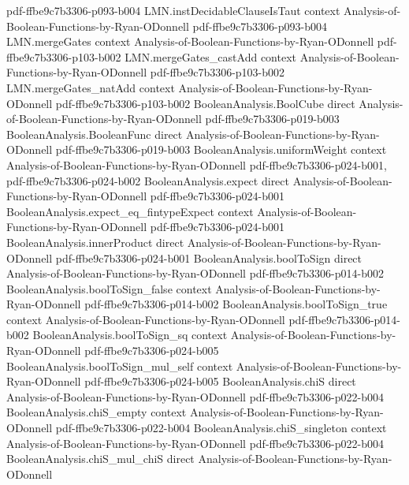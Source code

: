 \begin{theorem}
  {pdf-ffbe9c7b3306-p093-b004}
\proofstep
  {LMN.instDecidableClauseIsTaut}
  {context}
  {Analysis-of-Boolean-Functions-by-Ryan-ODonnell}
  {pdf-ffbe9c7b3306-p093-b004}
\proofstep
  {LMN.mergeGates}
  {context}
  {Analysis-of-Boolean-Functions-by-Ryan-ODonnell}
  {pdf-ffbe9c7b3306-p103-b002}
\proofstep
  {LMN.mergeGates_castAdd}
  {context}
  {Analysis-of-Boolean-Functions-by-Ryan-ODonnell}
  {pdf-ffbe9c7b3306-p103-b002}
\proofstep
  {LMN.mergeGates_natAdd}
  {context}
  {Analysis-of-Boolean-Functions-by-Ryan-ODonnell}
  {pdf-ffbe9c7b3306-p103-b002}
\proofstep
  {BooleanAnalysis.BoolCube}
  {direct}
  {Analysis-of-Boolean-Functions-by-Ryan-ODonnell}
  {pdf-ffbe9c7b3306-p019-b003}
\proofstep
  {BooleanAnalysis.BooleanFunc}
  {direct}
  {Analysis-of-Boolean-Functions-by-Ryan-ODonnell}
  {pdf-ffbe9c7b3306-p019-b003}
\proofstep
  {BooleanAnalysis.uniformWeight}
  {context}
  {Analysis-of-Boolean-Functions-by-Ryan-ODonnell}
  {pdf-ffbe9c7b3306-p024-b001,
    pdf-ffbe9c7b3306-p024-b002}
\proofstep
  {BooleanAnalysis.expect}
  {direct}
  {Analysis-of-Boolean-Functions-by-Ryan-ODonnell}
  {pdf-ffbe9c7b3306-p024-b001}
\proofstep
  {BooleanAnalysis.expect_eq_fintypeExpect}
  {context}
  {Analysis-of-Boolean-Functions-by-Ryan-ODonnell}
  {pdf-ffbe9c7b3306-p024-b001}
\proofstep
  {BooleanAnalysis.innerProduct}
  {direct}
  {Analysis-of-Boolean-Functions-by-Ryan-ODonnell}
  {pdf-ffbe9c7b3306-p024-b001}
\proofstep
  {BooleanAnalysis.boolToSign}
  {direct}
  {Analysis-of-Boolean-Functions-by-Ryan-ODonnell}
  {pdf-ffbe9c7b3306-p014-b002}
\proofstep
  {BooleanAnalysis.boolToSign_false}
  {context}
  {Analysis-of-Boolean-Functions-by-Ryan-ODonnell}
  {pdf-ffbe9c7b3306-p014-b002}
\proofstep
  {BooleanAnalysis.boolToSign_true}
  {context}
  {Analysis-of-Boolean-Functions-by-Ryan-ODonnell}
  {pdf-ffbe9c7b3306-p014-b002}
\proofstep
  {BooleanAnalysis.boolToSign_sq}
  {context}
  {Analysis-of-Boolean-Functions-by-Ryan-ODonnell}
  {pdf-ffbe9c7b3306-p024-b005}
\proofstep
  {BooleanAnalysis.boolToSign_mul_self}
  {context}
  {Analysis-of-Boolean-Functions-by-Ryan-ODonnell}
  {pdf-ffbe9c7b3306-p024-b005}
\proofstep
  {BooleanAnalysis.chiS}
  {direct}
  {Analysis-of-Boolean-Functions-by-Ryan-ODonnell}
  {pdf-ffbe9c7b3306-p022-b004}
\proofstep
  {BooleanAnalysis.chiS_empty}
  {context}
  {Analysis-of-Boolean-Functions-by-Ryan-ODonnell}
  {pdf-ffbe9c7b3306-p022-b004}
\proofstep
  {BooleanAnalysis.chiS_singleton}
  {context}
  {Analysis-of-Boolean-Functions-by-Ryan-ODonnell}
  {pdf-ffbe9c7b3306-p022-b004}
\proofstep
  {BooleanAnalysis.chiS_mul_chiS}
  {direct}
  {Analysis-of-Boolean-Functions-by-Ryan-ODonnell}

\end{theorem}
